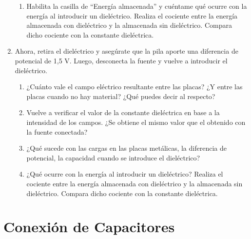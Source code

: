 \documentclass[12pt]{report}
\begin{document}
\begin{enumerate}
\begin{enumerate}
        \item Habilita la casilla de “Energía almacenada” y cuéntame qué ocurre con la energía al introducir un dieléctrico. Realiza el cociente entre la energía almacenada con dieléctrico y la almacenada sin dieléctrico. Compara dicho cociente con la constante dieléctrica.
    \end{enumerate}
    \item Ahora, retira el dieléctrico y asegúrate que la pila aporte una diferencia de potencial de 1,5 V. Luego, desconecta la fuente y vuelve a introducir el dieléctrico.
    \begin{enumerate}
        \item ¿Cuánto vale el campo eléctrico resultante entre las placas? ¿Y entre las placas cuando no hay material? ¿Qué puedes decir al respecto?
        \item Vuelve a verificar el valor de la constante dieléctrica en base a la intensidad de los campos. ¿Se obtiene el mismo valor que el obtenido con la fuente conectada?
        \item ¿Qué sucede con las cargas en las placas metálicas, la diferencia de potencial, la capacidad cuando se introduce el dieléctrico?
        \item ¿Qué ocurre con la energía al introducir un dieléctrico? Realiza el cociente entre la energía almacenada con dieléctrico y la almacenada sin dieléctrico. Compara dicho cociente con la constante dieléctrica.
    \end{enumerate}
\end{enumerate}

\section{Conexión de Capacitores}
\end{document}
